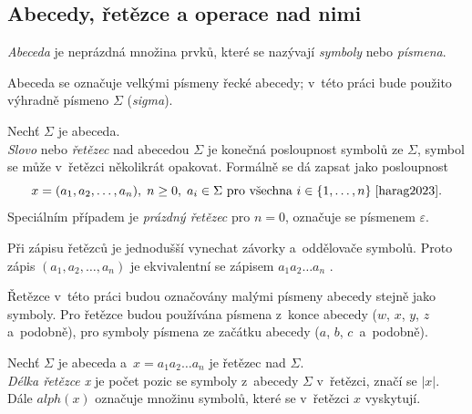 \subsection*{Abecedy, řetězce a operace nad nimi}

\begin{definition}
    \emph{Abeceda} je neprázdná množina prvků, které se nazývají \emph{symboly} nebo \emph{písmena}.
\end{definition}

\begin{convention}
    Abeceda se označuje velkými písmeny řecké abecedy; v~této práci bude použito výhradně písmeno $\Sigma$ (\emph{sigma}).
\end{convention}

\begin{definition}
    Nechť $\Sigma$ je abeceda. \\
    \emph{Slovo} nebo \emph{řetězec} nad abecedou $\Sigma$ je konečná posloupnost symbolů ze $\Sigma$, symbol se může v~řetězci několikrát opakovat.
    Formálně se dá zapsat jako posloupnost
    \begin{equation*}
        x = (a_1, a_2, \ldots, a_n),\; n \geq 0,\; a_i \in \Sigma \text{ pro všechna } i \in \{1, \ldots ,n\}\; \cite{harag2023}.
    \end{equation*}
    Speciálním případem je \emph{prázdný řetězec} pro $n = 0$, označuje se písmenem $\varepsilon$.
\end{definition}

\begin{convention}
    Při zápisu řetězců je jednodušší vynechat závorky a~oddělovače symbolů.
    Proto zápis $(a_1, a_2, \ldots, a_n)$ je ekvivalentní se zápisem $a_1a_2\ldots a_n$ \cite{harag2023}.
    
    Řetězce v~této práci budou označovány malými písmeny abecedy stejně jako symboly.
    Pro řetězce budou používána písmena z~konce abecedy ($w$, $x$, $y$, $z\,$ a~podobně), pro symboly písmena ze začátku abecedy ($a$, $b$, $c\,$ a~podobně).
\end{convention}

\begin{definition}
    Nechť $\Sigma$ je abeceda a~$x = a_1a_2\ldots a_n$ je řetězec nad $\Sigma$.\\
    \emph{Délka řetězce x} je počet pozic se symboly z~abecedy $\Sigma$ v~řetězci, značí se $|x|$.
    Dále $alph(x)$ označuje množinu symbolů, které se v~řetězci $x$ vyskytují.
\end{definition}

